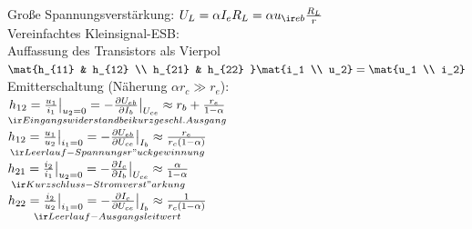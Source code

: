 \documentclass[fs, footer]{latex4ei}
\begin{document}
\begin{multicols*}{4}
Große Spannungsverstärkung: $U_L = \alpha I_eR_L = \alpha u_{\ir eb} \frac{R_L}{r}$\\
Vereinfachtes Kleinsignal-ESB:\\
Auffassung des Transistors als Vierpol\\
$\mat{h_{11} & h_{12} \\ h_{21} & h_{22} } \mat{i_1 \\ u_2} = \mat{u_1 \\ i_2}$\\
Emitterschaltung (Näherung $\alpha r_c \gg r_e$):\\
$\underset{\ir Eingangswiderstand bei kurzgeschl. Ausgang}{h_{12} = \frac{u_1}{i_1}\big|_{u_2=0} = -\frac{\partial U_{eb}}{\partial I_b}\big|_{U_{ce}} \approx r_b+\frac{r_e}{1-\alpha}}$ \ \\
$\underset{\ir Leerlauf-Spannungsr"uckgewinnung}{h_{12} = \frac{u_1}{u_2}\big|_{i_1=0} = -\frac{\partial U_{eb}}{\partial U_{ce}}\big|_{I_b} \approx \frac{r_e}{r_c(1-\alpha)}}$ \\
$\underset{\ir Kurzschluss-Stromverst"arkung}{h_{21} = \frac{i_2}{i_1}\big|_{u_2=0} = -\frac{\partial I_c}{\partial I_b}\big|_{U_{ce}} \approx \frac{\alpha}{1-\alpha}}$\\
$\underset{\ir Leerlauf-Ausgangsleitwert}{h_{22} = \frac{i_2}{u_2}\big|_{i_1=0} = -\frac{\partial I_c}{\partial U_{ce}}\big|_{I_b} \approx \frac{1}{r_c(1-\alpha)}}$\\
\end{multicols*}

\end{document}
